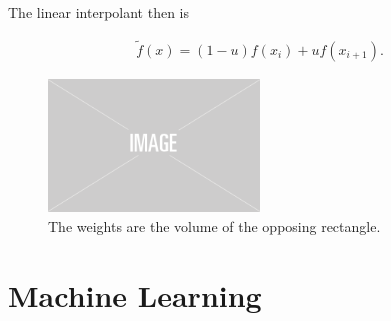 The linear interpolant then is

\begin{align}
\widetilde{f}(x) = (1-u)f(x_i) + uf(x_{i+1}).
\end{align}






\begin{figure}
    \centering
    \includegraphics[width=0.5\textwidth]{figures/img-placeholder.png}
    \caption{The weights are the volume of the opposing rectangle.}
    \label{fig:bilinear}
\end{figure}


\section{Machine Learning}




